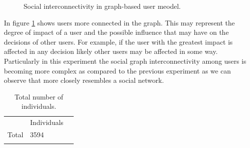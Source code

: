 \begin{figure}
\centering
{} %
\caption{Social interconnectivity in graph-based user meodel.}
\label{fig:graphKnown_3}
\end{figure}

In figure \ref{fig:graphKnown_3} shows users more connected in the graph. This
may represent the degree of impact of a user and the possible influence that may
have on the decisions of other users. For example, if the user with the greatest
impact is affected in any decision likely other users may be affected in some
way. Particularly in this experiment the social graph interconnectivity among
users is becoming more complex as compared to the previous experiment as we can
observe that more closely resembles a social network.


\begin{table}
\small
\caption{Total number of individuals.}
\label{tab:totalIndividuals_33}
\centering
\small
\begin{tabular}{p{3cm} p{3cm} p{3cm} }
\hline\noalign{\smallskip}
  & Individuals &  \\
\noalign{\smallskip}\hline\noalign{\smallskip}
\small{Total } & \small{3594} & \\ \hline
\noalign{\smallskip}\hline
\end{tabular}
\end{table}

